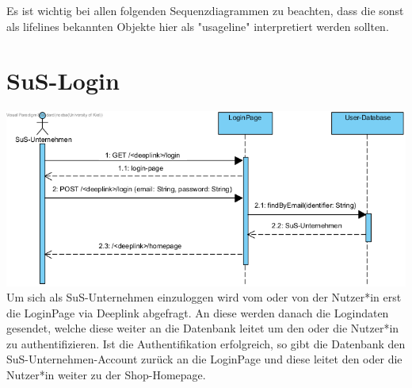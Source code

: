 Es ist wichtig bei allen folgenden Sequenzdiagrammen zu beachten, dass die sonst als lifelines bekannten Objekte hier als "usageline" interpretiert werden sollten.

\section{SuS-Login}
\includegraphics[width=\textwidth]{img/sequence-sus-login}
\label{fig: SuS-Login Sequenzdiagramm}
Um sich als SuS-Unternehmen einzuloggen wird vom oder von der Nutzer*in erst die LoginPage via Deeplink abgefragt. An diese werden danach die Logindaten gesendet, welche diese weiter an die Datenbank leitet um den oder die Nutzer*in zu authentifizieren. Ist die Authentifikation erfolgreich, so gibt die Datenbank den SuS-Unternehmen-Account zurück an die LoginPage und diese leitet den oder die Nutzer*in weiter zu der Shop-Homepage.

